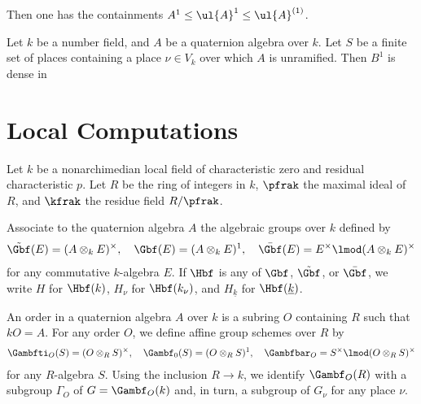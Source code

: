 Then one has the containments $A^1 \leq  \ul{A}^1 \leq \ul{A}^{(1)}$.


\begin{proposition}
    Let $k$ be a number field, and $A$ be a quaternion algebra over $k$. Let $S$ be a finite set of places containing a place $\nu \in V_k$ over which $A$ is unramified. Then $B^1$ is dense in
\end{proposition}
\newpage
\section{Local Computations}

Let $k$ be a nonarchimedian local field of characteristic zero and residual characteristic $p$. Let $R$ be the ring of integers in $k$,   $\pfrak$ the maximal ideal of $R$, and $\kfrak$ the residue field $R/\pfrak$.




\newpage



Associate to the quaternion algebra $A$ the algebraic groups over $k$ defined by
\begin{align*}
    \tilde{\Gbf}(E) = (A\otimes_k E)^\times,\quad \Gbf (E) = (A\otimes_k E)^1,\quad  \bar{\Gbf}(E) = E^\times \lmod (A\otimes_k E)^\times
\end{align*}
for any commutative $k$-algebra $E$. If $\Hbf$ is any of $\Gbf$, $\tilde{\Gbf}$, or $\bar{\Gbf}$, we write $H$ for $\Hbf(k)$, $H_\nu$ for $\Hbf(k_\nu)$, and $H_{\underline{k}}$ for $\Hbf(\underline{k})$.

An order in a quaternion algebra $A$ over $k$ is a subring $O$ containing $R$ such that $kO = A$. For any order $O$, we define affine group schemes over $R$ by
\begin{align*}
    \Gambfti_O(S) = (O\otimes_R S)^\times, \quad \Gambf_0(S) = (O\otimes_R S)^1, \quad \Gambfbar_O = S^\times \lmod (O\otimes_R S)^\times
\end{align*}
for any $R$-algebra $S$. Using the inclusion $R \to k$, we identify $\Gambf_O(R)$ with a subgroup $\Gamma_O$ of $G=\Gambf_O(k)$ and, in turn, a subgroup of $G_\nu$ for any place $\nu$.





